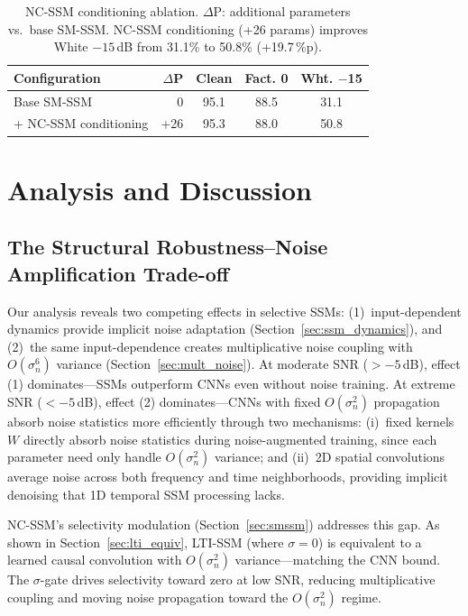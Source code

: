 \documentclass[journal]{IEEEtran}
\begin{document}
\begin{table}[t]
\centering
\caption{NC-SSM conditioning ablation. $\Delta$P: additional parameters vs.\ base SM-SSM. NC-SSM conditioning (+26 params) improves White $-15$\,dB from 31.1\% to 50.8\% (+19.7\,\%p).}
\label{tab:ablation}
\small
\setlength{\tabcolsep}{3pt}
\begin{tabular}{lrccc}
\toprule
\textbf{Configuration} & \textbf{$\Delta$P} & \textbf{Clean} & \textbf{Fact. 0} & \textbf{Wht. $-$15} \\
\midrule
Base SM-SSM     & 0   & 95.1 & 88.5 & 31.1 \\
\quad + NC-SSM conditioning      & +26 & 95.3 & 88.0 & 50.8 \\
\bottomrule
\end{tabular}
\end{table}


\section{Analysis and Discussion}
\label{sec:discussion}

\subsection{The Structural Robustness--Noise Amplification Trade-off}

Our analysis reveals two competing effects in selective SSMs:
(1)~input-dependent dynamics provide implicit noise adaptation (Section~\ref{sec:ssm_dynamics}), and
(2)~the same input-dependence creates multiplicative noise coupling with $O(\sigma_n^6)$ variance (Section~\ref{sec:mult_noise}).
At moderate SNR ($> -5$\,dB), effect (1) dominates---SSMs outperform CNNs even without noise training.
At extreme SNR ($< -5$\,dB), effect (2) dominates---CNNs with fixed $O(\sigma_n^2)$ propagation absorb noise statistics more efficiently through two mechanisms: (i)~fixed kernels $W$ directly absorb noise statistics during noise-augmented training, since each parameter need only handle $O(\sigma_n^2)$ variance; and (ii)~2D spatial convolutions average noise across both frequency and time neighborhoods, providing implicit denoising that 1D temporal SSM processing lacks.

NC-SSM's selectivity modulation (Section~\ref{sec:smssm}) addresses this gap.
As shown in Section~\ref{sec:lti_equiv}, LTI-SSM (where $\sigma = 0$) is equivalent to a learned causal convolution with $O(\sigma_n^2)$ variance---matching the CNN bound.
The $\sigma$-gate drives selectivity toward zero at low SNR, reducing multiplicative coupling and moving noise propagation toward the $O(\sigma_n^2)$ regime.
\end{document}
